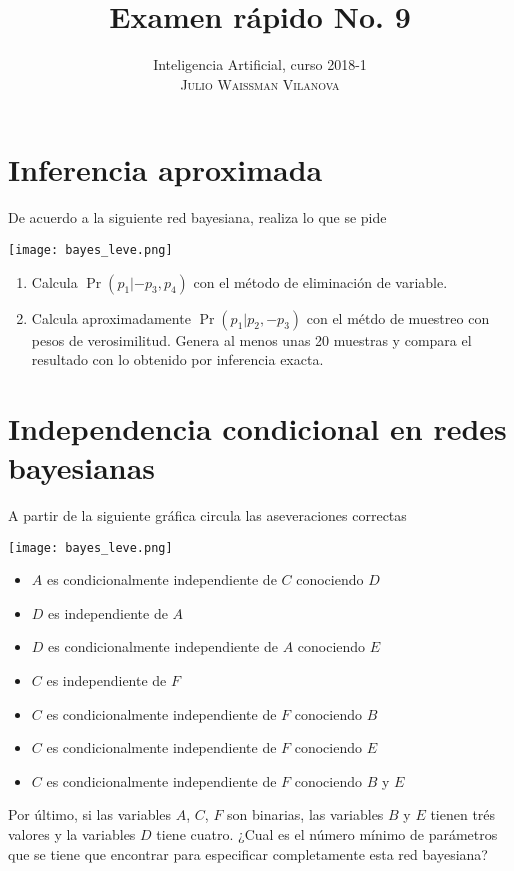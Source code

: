 \documentclass[onecolumn, letter, 11pt]{article}
\title{Examen rápido No. 9}
\author{Inteligencia Artificial, curso 2018-1\\ \textsc{Julio Waissman Vilanova}}
\date{}
\begin{document}
\maketitle

\section{Inferencia aproximada}

De acuerdo a la siguiente red bayesiana, realiza lo que se pide

\begin{center}
  \texttt{[image: bayes\_leve.png]}
\end{center}

\begin{enumerate}
\item Calcula $\Pr(p_1|-p_3, p_4)$ con el método de eliminación de variable.
\item Calcula aproximadamente $\Pr(p_1|p_2, -p_3)$ con el métdo de
  muestreo con pesos de verosimilitud. Genera al menos unas 20
  muestras y compara el resultado con lo obtenido por inferencia
  exacta.
\end{enumerate}

\newpage
\section{Independencia condicional en redes bayesianas}

A partir de la siguiente gráfica circula las aseveraciones correctas
\begin{center}
  \texttt{[image: bayes\_leve.png]}
\end{center}

\begin{itemize}
\item $A$ es condicionalmente independiente de $C$ conociendo $D$
\item $D$ es independiente de $A$
\item $D$ es condicionalmente independiente de $A$ conociendo $E$
\item $C$ es independiente de $F$
\item $C$ es condicionalmente independiente de $F$ conociendo $B$
\item $C$ es condicionalmente independiente de $F$ conociendo $E$
\item $C$ es condicionalmente independiente de $F$ conociendo $B$ y $E$
\end{itemize}

Por último, si las variables $A$, $C$, $F$ son binarias, las variables $B$ y $E$ tienen trés valores y la variables $D$ tiene cuatro. ¿Cual es el número mínimo de parámetros que se tiene que encontrar para especificar completamente esta red bayesiana?
\end{document}
